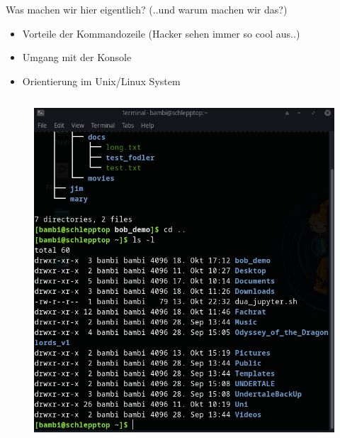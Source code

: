 \documentclass[t, xcolor=dvipsnames]{beamer}
\begin{document}
\begin{frame}{Was machen wir hier eigentlich?}{ (..und warum machen wir das?) }


\begin{itemize}
    \item Vorteile der Kommandozeile (Hacker sehen immer so cool aus..)
    \item Umgang mit der Konsole
    \item Orientierung im Unix/Linux System
\end{itemize}

\begin{columns}
    \begin{column}{0.5\textwidth}
    \begin{figure}
        \centering
        \includegraphics[width=1.0\textwidth]{graphics/terminal}
    \end{figure}
    \end{column}
    

\end{columns}
\end{frame}
\end{document}
